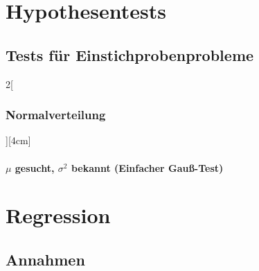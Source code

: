 \documentclass[8pt]{extarticle}
\begin{document}

\section{Hypothesentests}

\subsection{Tests für Einstichprobenprobleme}

\begin{multicols}{2}[\subsubsection{Normalverteilung}][4cm]

  \paragraph{ $\mu$ gesucht, $\sigma^2 $ bekannt (Einfacher Gauß-Test)}
  


\end{multicols}




\section{Regression}

\subsection{Annahmen}
\end{document}
